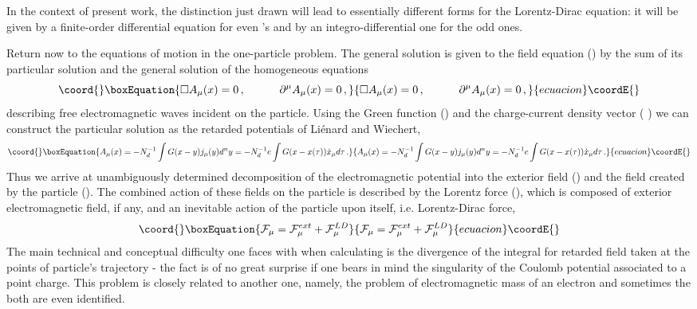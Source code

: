 \documentclass[a4paper,12pt]{article}
\begin{document}
In the context of present work, the distinction just drawn will lead to
essentially different forms for the Lorentz-Dirac equation: it will be given
by a finite-order differential equation for even \coordHE{}'s and by an
integro-differential one for the odd ones.

Return now to the equations of motion in the one-particle problem. The
general solution is given to the field equation (\myHighlight{$\ref{eq}$}\coordHE{}) by the sum of
its particular solution and the general solution of the homogeneous
equations
\begin{equation}\coord{}\boxEquation{  \label{heq}
\square A_{\mu}(x)=0\,,\;\;\;\;\;\;\;\;\;\;\; \partial^\mu A_\mu(x)=0\,,
}{  \square A_{\mu}(x)=0\,,\;\;\;\;\;\;\;\;\;\;\; \partial^\mu A_\mu(x)=0\,,
}{ecuacion}\coordE{}\end{equation}
describing free electromagnetic waves incident on the particle. Using the
Green function (\myHighlight{$\ref{gf}$}\coordHE{}) and the charge-current density vector (\myHighlight{$\ref{jf}$}\coordHE{}%
) we can construct the particular solution as the retarded potentials of
Li\'enard and Wiechert,
\begin{equation}\coord{}\boxEquation{  \label{ret}
A_\mu(x)=-N^{-1}_d\int G(x-y)j_\mu(y)d^ny =-N_d^{-1} e\int G(x-x(\tau ))\dot{
x}_\mu d\tau\,.
}{  A_\mu(x)=-N^{-1}_d\int G(x-y)j_\mu(y)d^ny =-N_d^{-1} e\int G(x-x(\tau ))\dot{
x}_\mu d\tau\,.
}{ecuacion}\coordE{}\end{equation}
Thus we arrive at unambiguously determined decomposition of the
electromagnetic potential into the exterior field (\myHighlight{$\ref{heq}$}\coordHE{}) and the
field created by the particle (\myHighlight{$\ref{ret}$}\coordHE{}). The combined action of these
fields on the particle is described by the Lorentz force (\myHighlight{$\ref{jf}$}\coordHE{}), which
is composed of exterior electromagnetic field, if any, and an inevitable
action of the particle upon itself, i.e. Lorentz-Dirac force,
\begin{equation*}\coord{}\boxEquation{
{\cal F}_\mu={\cal {F}}^{ext}_\mu+{\cal F}^{LD}_\mu
}{
{\cal F}_\mu={\cal {F}}^{ext}_\mu+{\cal F}^{LD}_\mu
}{ecuacion}\coordE{}\end{equation*}
The main technical and conceptual difficulty one faces with when calculating
\coordHE{} is the divergence of the integral for retarded field \myHighlight{$(\ref
{ret})$}\coordHE{} taken at the points of particle's trajectory - the fact is of no
great surprise if one bears in mind the singularity of the Coulomb potential
associated to a point charge. This problem is closely related to another
one, namely, the problem of electromagnetic mass of an electron and
sometimes the both are even identified.
\end{document}
